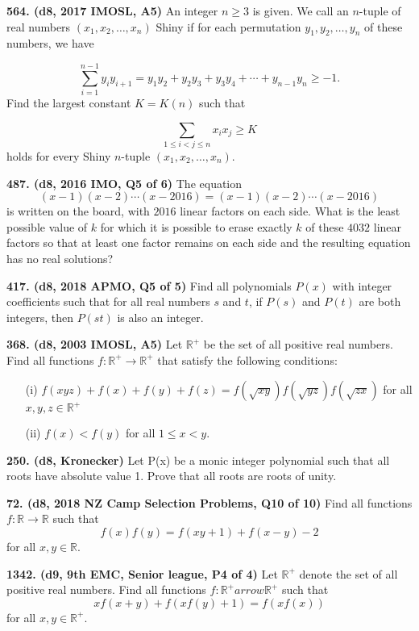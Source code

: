 \documentclass{article}
\begin{document}
\textbf{564. (\color{red}d8\color{black}, 2017 IMOSL, A5)} An integer $n \geq 3$ is given. We call an $n$-tuple of real numbers $(x_1, x_2, \dots, x_n)$ Shiny if for each permutation $y_1, y_2, \dots, y_n$ of these numbers, we have

\[\sum \limits_{i=1}^{n-1} y_i y_{i+1} = y_1y_2 + y_2y_3 + y_3y_4 + \cdots + y_{n-1}y_n \geq -1.\]Find the largest constant $K = K(n)$ such that

\[\sum \limits_{1 \leq i < j \leq n} x_i x_j \geq K\]holds for every Shiny $n$-tuple $(x_1, x_2, \dots, x_n)$.

\textbf{487. (\color{red}d8\color{black}, 2016 IMO, Q5 of 6)} The equation
$$(x-1)(x-2)\cdots(x-2016)=(x-1)(x-2)\cdots (x-2016)$$is written on the board, with $2016$ linear factors on each side. What is the least possible value of $k$ for which it is possible to erase exactly $k$ of these $4032$ linear factors so that at least one factor remains on each side and the resulting equation has no real solutions?

\textbf{417. (\color{red}d8\color{black}, 2018 APMO, Q5 of 5)} Find all polynomials $P(x)$ with integer coefficients such that for all real numbers $s$ and $t$, if $P(s)$ and $P(t)$ are both integers, then $P(st)$ is also an integer.

\textbf{368. (\color{red}d8\color{black}, 2003 IMOSL, A5)} Let $\mathbb{R}^+$ be the set of all positive real numbers. Find all functions $f: \mathbb{R}^+ \to \mathbb{R}^+$ that satisfy the following conditions:
\begin{enumerate}
    \item[(i)] $f(xyz)+f(x)+f(y)+f(z)=f(\sqrt{xy})f(\sqrt{yz})f(\sqrt{zx})$ for all $x,y,z\in\mathbb{R}^+$
    \item[(ii)] $f(x)<f(y)$ for all $1\le x<y$.
\end{enumerate}

\textbf{250. (\color{red}d8\color{black}, Kronecker)} Let P(x) be a monic integer polynomial such that all roots have absolute value 1. Prove that all roots are roots of unity.

\textbf{72. (\color{red}d8\color{black}, 2018 NZ Camp Selection Problems, Q10 of 10)} Find all functions $f : \mathbb{R} \to \mathbb{R}$ such that \[f(x)f(y) = f(xy+1)+f(x-y)-2\] for all $x, y \in \mathbb{R}.$

\textbf{1342. (\color{red}d9\color{black}, 9th EMC, Senior league, P4 of 4)} Let $\mathbb{R^+}$ denote the set of all positive real numbers. Find all functions $f: \mathbb{R^+}arrow \mathbb{R^+}$ such that
$$xf(x + y) + f(xf(y) + 1) = f(xf(x))$$for all $x, y \in\mathbb{R^+}.$
\end{document}
